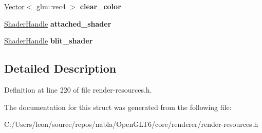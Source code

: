 \begin{DoxyCompactItemize}
\item 
\mbox{\label{structnabla_1_1renderer_1_1_frame_buffer_a8affb17133633c659b2ddbaa573336bc}} 
\mbox{\hyperlink{classnabla_1_1_s_t_l_vector_ex}{Vector}}$<$ glm\+::vec4 $>$ {\bfseries clear\+\_\+color}
\item 
\mbox{\label{structnabla_1_1renderer_1_1_frame_buffer_af1e97d3d98b5e21f53f622ef33dd5c24}} 
\mbox{\hyperlink{classnabla_1_1renderer_1_1_handle}{Shader\+Handle}} {\bfseries attached\+\_\+shader}
\item 
\mbox{\label{structnabla_1_1renderer_1_1_frame_buffer_a6302d025544277a4648b47e086a30460}} 
\mbox{\hyperlink{classnabla_1_1renderer_1_1_handle}{Shader\+Handle}} {\bfseries blit\+\_\+shader}
\end{DoxyCompactItemize}


\subsection{Detailed Description}


Definition at line 220 of file render-\/resources.\+h.



The documentation for this struct was generated from the following file\+:\begin{DoxyCompactItemize}
\item 
C\+:/\+Users/leon/source/repos/nabla/\+Open\+G\+L\+T6/core/renderer/render-\/resources.\+h\end{DoxyCompactItemize}

